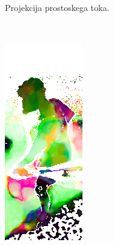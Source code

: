 \begin{figure}[!htb]
\begin{subfigure}[t]{0.3\columnwidth}
		\caption{Projekcija prostoskega toka.}
		\label{fig:stage2-field-pd}
	\end{subfigure}
	~
	\begin{subfigure}[t]{0.3\columnwidth}
		\centering
		\includegraphics[width=\columnwidth, frame]{./Slike/stage2-field-sf-pd-tr-corrected.jpg}

\end{subfigure}
\end{figure}
